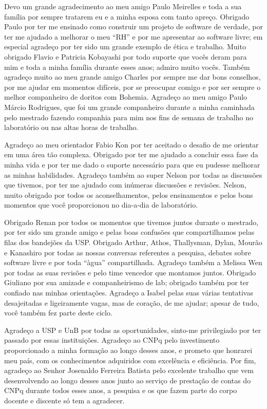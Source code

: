 Devo um grande agradecimento ao meu amigo Paulo Meirelles e toda a sua família
por sempre tratarem eu e a minha esposa com tanto apreço. Obrigado Paulo por
ter me ensinado como construir um projeto de software de verdade, por ter me
ajudado a melhorar o meu “RH” e por me apresentar ao software livre; em
especial agradeço por ter sido um grande exemplo de ética e trabalho. Muito
obrigado Flavio e Patricia Kobayashi por todo suporte que vocês deram para mim
e toda a minha família durante esses anos; admiro muito vocês. Também agradeço
muito ao meu grande amigo Charles por sempre me dar bons conselhos, por me
ajudar em momentos difíceis, por se preocupar comigo e por ser sempre o melhor
companheiro de doritos com Bohemia. Agradeço ao meu amigo Paulo Márcio
Rodrigues, que foi um grande companheiro durante a minha caminhada pelo
mestrado fazendo companhia para mim nos fins de semana de trabalho no
laboratório ou nas altas horas de trabalho.

Agradeço ao meu orientador Fabio Kon por ter aceitado o desafio de me orientar
em uma área tão complexa. Obrigado por ter me ajudado a concluir essa fase da
minha vida e por ter me dado o suporte necessário para que eu pudesse melhorar
as minhas habilidades. Agradeço também ao super Nelson por todas as discussões
que tivemos, por ter me ajudado com inúmeras discussões e revisões. Nelson,
muito obrigado por todos os aconselhamentos, pelos ensinamentos e pelos bons
momentos que você proporcionou no dia-a-dia de laboratório.

Obrigado Renan por todos os momentos que tivemos juntos durante o mestrado, por
ter sido um grande amigo e pelas boas confusões que compartilhamos pelas filas
dos bandejões da USP. Obrigado Arthur, Athos, Thallysman, Dylan, Mourão e
Kanashiro por todas as nossas conversas referentes a pesquisa, debates sobre
software livre e por toda “àgua” compartilhada. Agradeço também a Melissa Wen
por todas as suas revisões e pelo time vencedor que montamos juntos. Obrigado
Giuliano por sua amizade e companheirismo de lab; obrigado também por ter
confiado nas minhas orientações. Agradeço a Isabel pelas suas várias tentativas
desajeitadas e ligeiramente vagas, mas de coração, de me ajudar; apesar de
tudo, você também fez parte deste ciclo.

Agradeço a USP e UnB por todas as oportunidades, sinto-me privilegiado por ter
passado por essas instituições. Agradeço ao CNPq pelo investimento
proporcionado a minha formação ao longo desses anos, e prometo  que honrarei
meu país, com os conhecimentos adquiridos com excelência e eficiência.  Por
fim, agradeço ao Senhor Josenaldo Ferreira Batista pelo excelente trabalho que
vem desenvolvendo ao longo desses anos junto ao serviço de prestação de contas
do CNPq durante todos esses anos,  a pesquisa e os que fazem parte do corpo
docente e discente só tem a agradecer.

